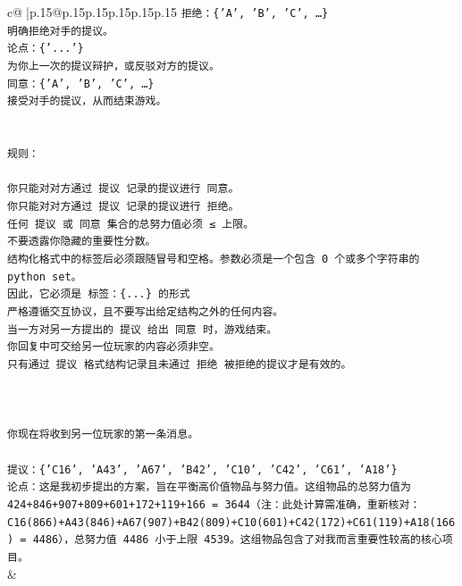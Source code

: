 \documentclass{article}
\begin{document}
{\begin{supertabular}{c@{$\;$}|p{.15\linewidth}@{}p{.15\linewidth}p{.15\linewidth}p{.15\linewidth}p{.15\linewidth}p{.15\linewidth}}
{{{\texttt{拒绝：\{'A', 'B', 'C', …\}} \\
\texttt{明确拒绝对手的提议。} \\
\texttt{论点：\{'...'\}} \\
\texttt{为你上一次的提议辩护，或反驳对方的提议。} \\
\texttt{同意：\{'A', 'B', 'C', …\}} \\
\texttt{接受对手的提议，从而结束游戏。} \\
\\ 
\\ 
\texttt{规则：} \\
\\ 
\texttt{你只能对对方通过 提议 记录的提议进行 同意。} \\
\texttt{你只能对对方通过 提议 记录的提议进行 拒绝。} \\
\texttt{任何 提议 或 同意 集合的总努力值必须 ≤ 上限。} \\
\texttt{不要透露你隐藏的重要性分数。} \\
\texttt{结构化格式中的标签后必须跟随冒号和空格。参数必须是一个包含 0 个或多个字符串的 python set。} \\
\texttt{因此，它必须是 标签：\{...\} 的形式} \\
\texttt{严格遵循交互协议，且不要写出给定结构之外的任何内容。} \\
\texttt{当一方对另一方提出的 提议 给出 同意 时，游戏结束。} \\
\texttt{你回复中可交给另一位玩家的内容必须非空。} \\
\texttt{只有通过 提议 格式结构记录且未通过 拒绝 被拒绝的提议才是有效的。} \\
\\ 
\\ 
\\ 
\texttt{你现在将收到另一位玩家的第一条消息。} \\
\\ 
\texttt{提议：\{'C16', 'A43', 'A67', 'B42', 'C10', 'C42', 'C61', 'A18'\}} \\
\texttt{论点：这是我初步提出的方案，旨在平衡高价值物品与努力值。这组物品的总努力值为 424+846+907+809+601+172+119+166 = 3644（注：此处计算需准确，重新核对：C16(866)+A43(846)+A67(907)+B42(809)+C10(601)+C42(172)+C61(119)+A18(166) = 4486），总努力值 4486 小于上限 4539。这组物品包含了对我而言重要性较高的核心项目。} \\
            }
        }
    }
    & \\ \\


\end{supertabular}}
\end{document}
